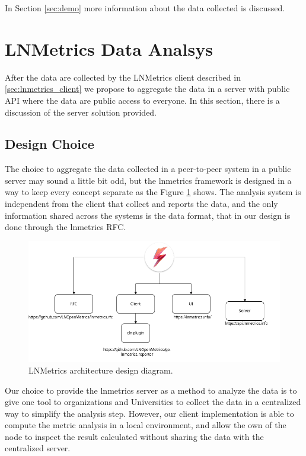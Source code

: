 In Section \ref{sec:demo} more information about the data collected is discussed.

\section{LNMetrics Data Analsys}
\label{sec:lnmetrics_server}

After the data are collected by the LNMetrics client described in \ref{sec:lnmetrics_client}
we propose to aggregate the data in a server with public API where the data are 
public access to everyone. In this section, there is a discussion of 
the server solution provided.

\subsection{Design Choice}

The choice to aggregate the data collected in a peer-to-peer system in a public 
server may sound a little bit odd, but the lnmetrics framework is designed in a 
way to keep every concept separate as the Figure \ref{fig:lnmetrics_architecture} 
shows. The analysis system is independent from the client that collect and reports
the data, and the only information shared across the systems is the data format, 
that in our design is done through the lnmetrics RFC.

\begin{figure}
    \begin{center}
    \includegraphics[scale=0.5]{imgs/lnmetrics-architecture.drawio.png}
    \end{center}
    \caption{LNMetrics architecture design diagram.}
    \label{fig:lnmetrics_architecture}
\end{figure}

Our choice to provide the lnmetrics server as a method to analyze the data is to 
give one tool to organizations and Universities to collect the data in a centralized
way to simplify the analysis step. However, our client implementation is able
to compute the metric analysis in a local environment, and allow the own
of the node to inspect the result calculated without sharing the data with the centralized
server.

